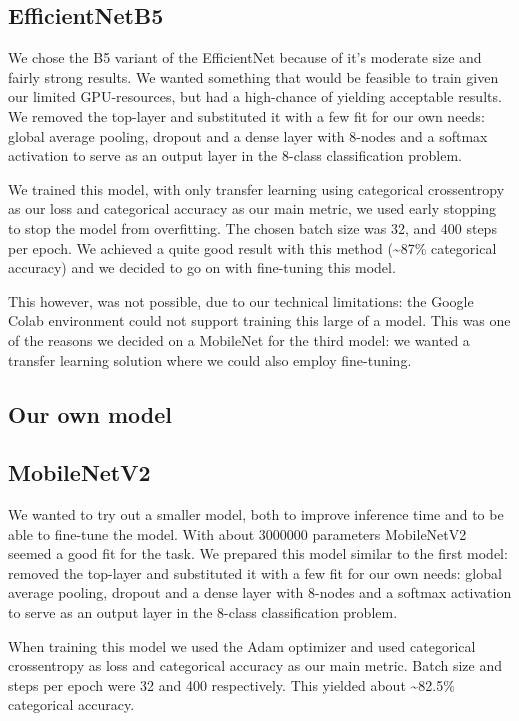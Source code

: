 \documentclass[twocolumn]{article}
\begin{document}
	\subsection{EfficientNetB5}
	
	We chose the B5 variant of the EfficientNet because of it's moderate size and fairly strong results. We wanted something that would be feasible to train given our limited GPU-resources, but had a high-chance of yielding acceptable results. We removed the top-layer and substituted it with a few fit for our own needs: global average pooling, dropout and a dense layer with 8-nodes and a softmax activation to serve as an output layer in the 8-class classification problem.
	
	We trained this model, with only transfer learning using categorical crossentropy as our loss and categorical accuracy as our main metric, we used early stopping to stop the model from overfitting. The chosen batch size was 32, and 400 steps per epoch. We achieved a quite good result with this method (\textasciitilde87\% categorical accuracy) and we decided to go on with fine-tuning this model. 
	
	This however, was not possible, due to our technical limitations: the Google Colab environment could not support training this large of a model. This was one of the reasons we decided on a MobileNet for the third model: we wanted a transfer learning solution where we could also employ fine-tuning. 
	
	\subsection{Our own model}
	
	
	
	\subsection{MobileNetV2}
	
	We wanted to try out a smaller model, both to improve inference time and to be able to fine-tune the model. With about $3000000$ parameters MobileNetV2 seemed a good fit for the task. We prepared this model similar to the first model: removed the top-layer and substituted it with a few fit for our own needs: global average pooling, dropout and a dense layer with 8-nodes and a softmax activation to serve as an output layer in the 8-class classification problem.
	
	When training this model we used the Adam optimizer and used categorical crossentropy as loss and categorical accuracy as our main metric. Batch size and steps per epoch were 32 and 400 respectively. This yielded about \textasciitilde82.5\% categorical accuracy.
	
\end{document}
